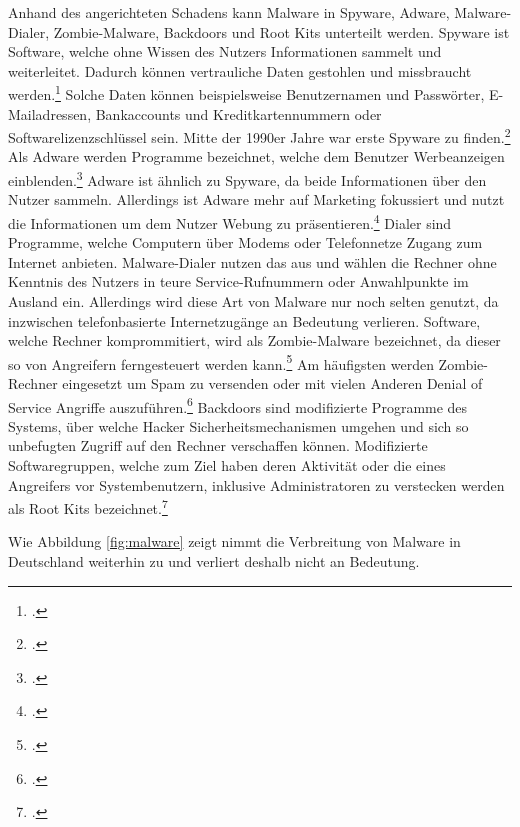 Anhand des angerichteten Schadens kann Malware in Spyware, Adware, Malware-Dialer, Zombie-Malware,
Backdoors und Root Kits unterteilt werden. Spyware ist Software, welche ohne Wissen des Nutzers
Informationen sammelt und weiterleitet. Dadurch können vertrauliche Daten gestohlen und missbraucht
werden.\footcite[Vgl.][95\psq]{netzwerkDatensicherheit} Solche Daten können beispielsweise
Benutzernamen und Passwörter, E-Mailadressen, Bankaccounts und Kreditkartennummern oder
Softwarelizenzschlüssel sein. Mitte der 1990er Jahre war erste Spyware zu
finden.\footcite[Vgl.][16]{virusesMalware} Als Adware werden Programme bezeichnet, welche dem
Benutzer Werbeanzeigen einblenden.\footcite[Vgl.][96]{netzwerkDatensicherheit} Adware ist ähnlich
zu Spyware, da beide Informationen über den Nutzer sammeln. Allerdings ist Adware mehr auf
Marketing fokussiert und nutzt die Informationen um dem Nutzer Webung zu
präsentieren.\footcite[Vgl.][17]{virusesMalware} Dialer sind Programme, welche Computern über
Modems oder Telefonnetze Zugang zum Internet anbieten. Malware-Dialer nutzen das aus und wählen die
Rechner ohne Kenntnis des Nutzers in teure Service-Rufnummern oder Anwahlpunkte im Ausland ein.
Allerdings wird diese Art von Malware nur noch selten genutzt, da inzwischen
telefonbasierte Internetzugänge an Bedeutung verlieren. Software, welche Rechner komprommitiert, wird als
Zombie-Malware bezeichnet, da dieser so von Angreifern ferngesteuert werden
kann.\footcite[Vgl.][96]{netzwerkDatensicherheit} Am häufigsten werden Zombie-Rechner eingesetzt um
Spam zu versenden oder mit vielen Anderen Denial of Service Angriffe
auszuführen.\footcite[Vgl.][18]{virusesMalware} Backdoors sind modifizierte Programme des Systems,
über welche Hacker Sicherheitsmechanismen umgehen und sich so unbefugten Zugriff auf den Rechner
verschaffen können. Modifizierte Softwaregruppen, welche zum Ziel haben deren Aktivität oder die
eines Angreifers vor Systembenutzern, inklusive Administratoren zu verstecken werden als Root Kits
bezeichnet.\footcite[Vgl.][96]{netzwerkDatensicherheit}

Wie Abbildung \ref{fig:malware} zeigt nimmt die Verbreitung von Malware in Deutschland weiterhin zu
und verliert deshalb nicht an Bedeutung.


